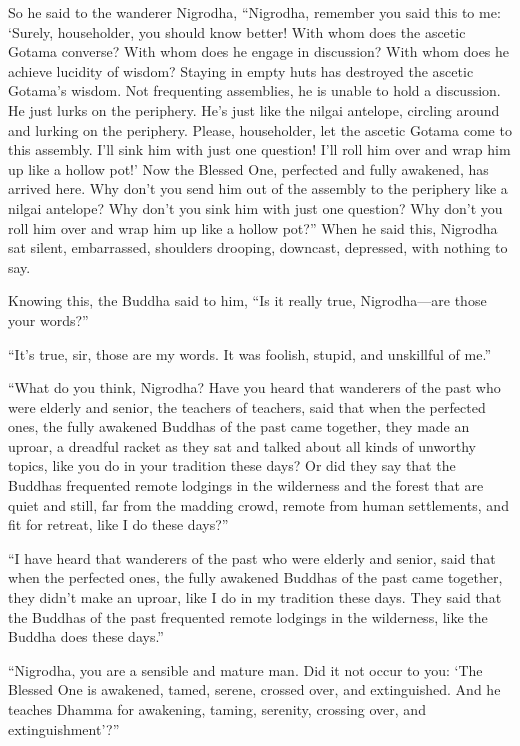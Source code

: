 \documentclass[12pt,openany]{book}%
\begin{document}
So he said to the wanderer Nigrodha, “Nigrodha, remember you said this to me: ‘Surely, householder, you should know better! With whom does the ascetic Gotama converse? With whom does he engage in discussion? With whom does he achieve lucidity of wisdom? Staying in empty huts has destroyed the ascetic Gotama’s wisdom. Not frequenting assemblies, he is unable to hold a discussion. He just lurks on the periphery. He’s just like the nilgai antelope, circling around and lurking on the periphery. Please, householder, let the ascetic Gotama come to this assembly. I’ll sink him with just one question! I’ll roll him over and wrap him up like a hollow pot!’ Now the Blessed One, perfected and fully awakened, has arrived here. Why don’t you send him out of the assembly to the periphery like a nilgai antelope? Why don’t you sink him with just one question? Why don’t you roll him over and wrap him up like a hollow pot?” When he said this, Nigrodha sat silent, embarrassed, shoulders drooping, downcast, depressed, with nothing to say. 

Knowing this, the Buddha said to him, “Is it really true, Nigrodha—are those your words?” 

“It’s true, sir, those are my words. It was foolish, stupid, and unskillful of me.” 

“What do you think, Nigrodha? Have you heard that wanderers of the past who were elderly and senior, the teachers of teachers, said that when the perfected ones, the fully awakened Buddhas of the past came together, they made an uproar, a dreadful racket as they sat and talked about all kinds of unworthy topics, like you do in your tradition these days? Or did they say that the Buddhas frequented remote lodgings in the wilderness and the forest that are quiet and still, far from the madding crowd, remote from human settlements, and fit for retreat, like I do these days?” 

“I have heard that wanderers of the past who were elderly and senior, said that when the perfected ones, the fully awakened Buddhas of the past came together, they didn’t make an uproar, like I do in my tradition these days. They said that the Buddhas of the past frequented remote lodgings in the wilderness, like the Buddha does these days.” 

“Nigrodha, you are a sensible and mature man. Did it not occur to you: ‘The Blessed One is awakened, tamed, serene, crossed over, and extinguished. And he teaches Dhamma for awakening, taming, serenity, crossing over, and extinguishment’?” 
\end{document}
